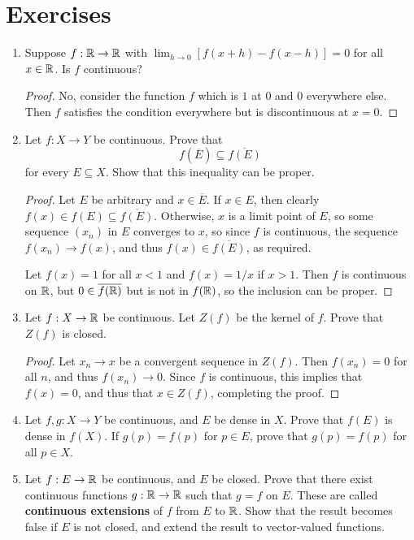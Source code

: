\section{Exercises}
\begin{enumerate}
\item %
Suppose $f: \mathbb{R} \rightarrow \mathbb{R}$ with $\lim_{h \to 0}[f(x+h) - f(x-h)] = 0$ for all $x \in \mathbb{R}$. Is $f$ continuous?
\begin{proof}
No, consider the function $f$ which is $1$ at $0$ and $0$ everywhere else. Then $f$ satisfies the condition everywhere but is discontinuous at $x = 0$.
\end{proof}

\item %
Let $f: X \to Y$ be continuous. Prove that
\[
    f(\overline{E}) \subseteq \overline{f(E)}
\]
for every $E \subseteq X$. Show that this inequality can be proper.

\begin{proof}
    Let $E$ be arbitrary and $x \in \overline{E}$. If $x \in E$, then clearly $f(x) \in f(E) \subseteq \overline{f(E)}$. Otherwise, $x$ is a limit point of $E$, so some sequence $(x_n)$ in $E$ converges to $x$, so since $f$ is continuous, the sequence $f(x_n) \to f(x)$, and thus $f(x) \in \overline{f(E)}$, as required.

    Let $f(x) = 1$ for all $x < 1$ and $f(x) = 1/x$ if $x > 1$. Then $f$ is continuous on $\mathbb{R}$, but $0 \in \overline{f(\mathbb{R})}$ but is not in $f(\mathbb{R})$, so the inclusion can be proper.
\end{proof}

\item %
Let $f: X \rightarrow \mathbb{R}$ be continuous. Let $Z(f)$ be the kernel of $f$. Prove that $Z(f)$ is closed.
\begin{proof}
    Let $x_n \to x$ be a convergent sequence in $Z(f)$. Then $f(x_n) = 0$ for all $n$, and thus $f(x_n) \to 0$. Since $f$ is continuous, this implies that $f(x) = 0$, and thus that $x \in Z(f)$, completing the proof.
\end{proof}

\item %
Let $f, g: X \to Y$ be continuous, and $E$ be dense in $X$. Prove that $f(E)$ is dense in $f(X)$. If $g(p) = f(p)$ for $p \in E$, prove that $g(p) = f(p)$ for all $p \in X$.

\item %
Let $f: E \rightarrow \mathbb{R}$ be continuous, and $E$ be closed. Prove that there exist continuous functions $g: \mathbb{R} \rightarrow \mathbb{R}$ such that $g = f$ on $E$. These are called \textbf{continuous extensions} of $f$ from $E$ to $\mathbb{R}$. Show that the result becomes false if $E$ is not closed, and extend the result to vector-valued functions.


\end{enumerate}
